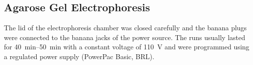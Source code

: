 \subsection{Agarose Gel Electrophoresis\label{gel-electrophoresis}}
The lid of the electrophoresis chamber was closed carefully and the banana plugs were connected to the banana jacks of the power source. The runs usually lasted for \SIrange{40}{50}{\minute} with a constant voltage of \SI{110}{\volt} and were programmed using a regulated power supply (PowerPac Basic, BRL).

